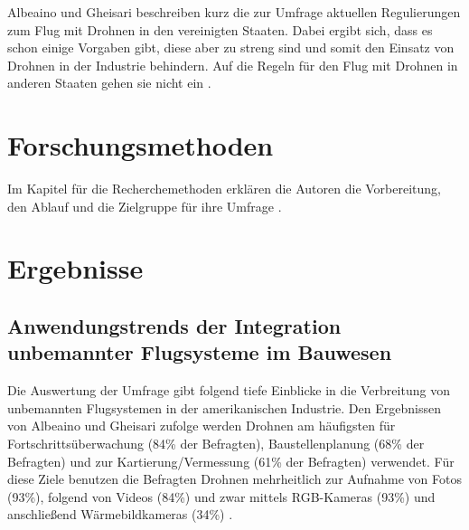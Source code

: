 Albeaino und Gheisari beschreiben kurz die zur Umfrage aktuellen Regulierungen zum Flug mit Drohnen in den vereinigten Staaten.
Dabei ergibt sich, dass es schon einige Vorgaben gibt, diese aber zu streng sind und somit den Einsatz von Drohnen in der Industrie behindern.
Auf die Regeln für den Flug mit Drohnen in anderen Staaten gehen sie nicht ein \cite[S. 92]{abaeano2021trends}.

\section{Forschungsmethoden}
Im Kapitel für die Recherchemethoden erklären die Autoren die Vorbereitung, den Ablauf und die Zielgruppe für ihre Umfrage \cite[S. 93]{abaeano2021trends}.

\section{Ergebnisse}
\subsection{Anwendungstrends der Integration unbemannter Flugsysteme im Bauwesen}


Die Auswertung der Umfrage gibt folgend tiefe Einblicke in die Verbreitung von unbemannten Flugsystemen in der amerikanischen Industrie.
Den Ergebnissen von Albeaino und Gheisari zufolge werden Drohnen am häufigsten für Fortschrittsüberwachung (84\% der Befragten), Baustellenplanung (68\% der Befragten) und zur Kartierung/Vermessung (61\% der Befragten) verwendet.
Für diese Ziele benutzen die Befragten Drohnen mehrheitlich zur Aufnahme von Fotos (93\%), folgend von Videos (84\%) und zwar mittels RGB-Kameras (93\%) und anschließend Wärmebildkameras (34\%) \cite[S. 95--97]{abaeano2021trends}.

